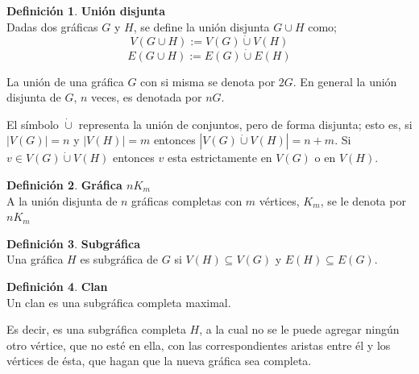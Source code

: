 \documentclass[12pt]{book}
\theoremstyle{definition}
\newtheorem{definition}{Definición}
\begin{document}
\begin{definition}\textbf{Unión disjunta}\\
  Dadas dos gráficas $G$ y $H$, se define la unión disjunta $G\cup H$
  como;
$$V(G\cup H):=V(G)\dot{\cup}V(H)$$ $$E(G\cup H):=E(G)\dot{\cup}E(H)$$
\end{definition}

La unión de una gráfica $G$ con si misma se denota por $2G$. En general la unión
disjunta de $G$, $n$ veces, es denotada por $nG$. 

El símbolo $\dot{\cup}$ representa la unión de conjuntos, pero de
forma disjunta; esto es, si $|V(G)|=n$ y $|V(H)|=m$ entonces
$|V(G)\dot{\cup}V(H)|= n + m$. Si $v \in V(G)\dot{\cup}V(H)$ entonces
$v$ esta estrictamente en $V(G)$ o en $V(H)$.


\begin{definition}\textbf{Gráfica $nK_m$}\\
  A la unión disjunta de $n$ gráficas completas con $m$ vértices, $K_m$, se le denota por $nK_m$
\end{definition}


\begin{definition}\textbf{Subgráfica}\\
  Una gráfica $H$ es subgráfica de $G$ si $V(H)\subseteq V(G)$ y
  $E(H)\subseteq E(G)$.
\end{definition}


\begin{definition}\textbf{Clan}\\
  Un clan es una subgráfica completa maximal.
\end{definition}

Es decir, es una subgráfica completa $H$, a la cual no se le puede
agregar ningún otro vértice, que no esté en ella, con las
correspondientes aristas entre \'el y los vértices de \'esta, que
hagan que la nueva gráfica sea completa.
\end{document}
